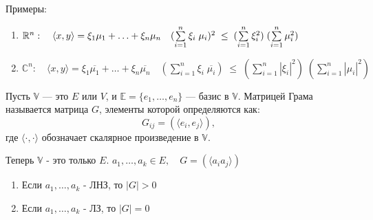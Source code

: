 \begin{shex}
    Примеры:
    \begin{enumerate}
        \item $\mathbb{R}^n: \quad \langle x, y \rangle = \xi_1 \mu_1 + \ldots + \xi_n \mu_n \quad (\sum\limits_{i = 1}^{n} \xi_i \; \mu_i)^2 \; \leq \; (\sum\limits_{i = 1}^{n} \xi_{i}^2) \; (\sum\limits_{i = 1}^{n} \mu_{i}^2)$
        \item $\mathbb{C}^n: \quad \langle x,y \rangle = \xi_{1} \overline{\mu_{1}} + \ldots + \xi_{n} \overline{\mu_{n}} \quad (\sum\limits_{i = 1}^{n} \xi_{i} \; \overline{\mu_{i}}) \; \leq \; (\sum\limits_{i = 1}^{n} |\xi_{i}|^2) \; (\sum\limits_{i = 1}^{n} |\mu_{i}|^2)$
    \end{enumerate}
\end{shex}

\clearpage
\begin{shdef}
\begin{definition}
    \leavevmode \newline
    Пусть $\mathbb{V}$ — это $E$ или $V$, и $\mathbb{E} = \{e_1, \ldots, e_n\}$ — базис в $\mathbb{V}$. \newline
    Матрицей Грама называется матрица $G$, элементы которой определяются как:
    \[
    G_{ij} = (\langle e_i, e_j \rangle),
    \]
    где $\langle \cdot, \cdot \rangle$ обозначает скалярное произведение в $\mathbb{V}$.
\end{definition}
\end{shdef}

\vspace{0.2cm}

\begin{shth}
    \begin{theorem}
        Теперь $\mathbb{V}$ - это только $E$. \newline
        $a_{1}, \ldots, a_{k} \in E, \quad G = (\langle a_{i} a_{j} \rangle)$
        
        \begin{enumerate}
            \item Если ${a_{1}, \ldots, a_{k}}$ - ЛНЗ, то $|G| > 0$
            \item Если ${a_{1}, \ldots, a_{k}}$ - ЛЗ, то $|G| = 0$
        \end{enumerate}
    \end{theorem}
\end{shth}

